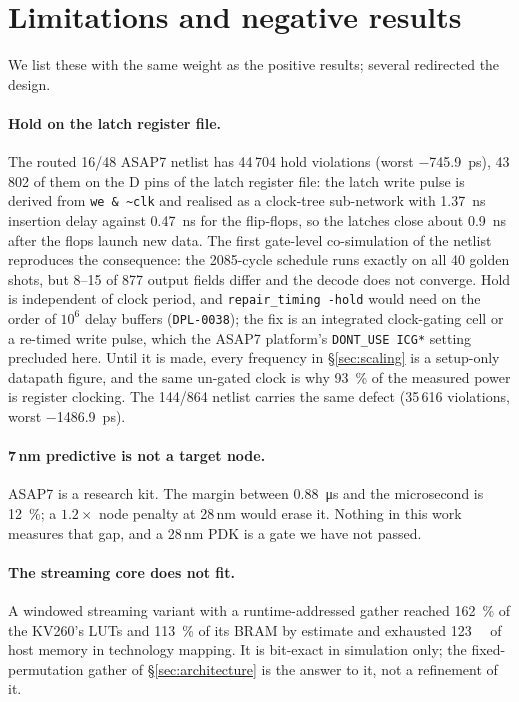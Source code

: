 \section{Limitations and negative results}
\label{sec:limitations}

We list these with the same weight as the positive results; several redirected the design.

\paragraph{Hold on the latch register file.}
The routed 16/48 ASAP7 netlist has 44\,704 hold violations (worst \SI{-745.9}{\pico\second}), 43\,802
of them on the D pins of the latch register file: the latch write pulse is derived from
\texttt{we \& \textasciitilde{}clk} and realised as a clock-tree sub-network with \SI{1.37}{\nano\second}
insertion delay against \SI{0.47}{\nano\second} for the flip-flops, so the latches close about
\SI{0.9}{\nano\second} after the flops launch new data. The first gate-level co-simulation of the
netlist reproduces the consequence: the 2085-cycle schedule runs exactly on all 40 golden shots, but
8--15 of 877 output fields differ and the decode does not converge. Hold is independent of clock
period, and \texttt{repair\_timing -hold} would need on the order of $10^6$ delay buffers
(\texttt{DPL-0038}); the fix is an integrated clock-gating cell or a re-timed write pulse, which the
ASAP7 platform's \texttt{DONT\_USE ICG*} setting precluded here. Until it is made, every frequency
in \S\ref{sec:scaling} is a setup-only datapath figure, and the same un-gated clock is why
\SI{93}{\percent} of the measured power is register clocking. The 144/864 netlist carries the same
defect (35\,616 violations, worst \SI{-1486.9}{\pico\second}).

\paragraph{7\,nm predictive is not a target node.}
ASAP7 \citep{clark2016asap7} is a research kit. The margin between \SI{0.88}{\micro\second} and the
microsecond is \SI{12}{\percent}; a $1.2\times$ node penalty at 28\,nm would erase it. Nothing in this
work measures that gap, and a 28\,nm PDK is a gate we have not passed.

\paragraph{The streaming core does not fit.}
A windowed streaming variant with a runtime-addressed gather reached \SI{162}{\percent} of the KV260's
LUTs and \SI{113}{\percent} of its BRAM by estimate and exhausted \SI{123}{\giga\byte} of host memory
in technology mapping. It is bit-exact in simulation only; the fixed-permutation gather of
\S\ref{sec:architecture} is the answer to it, not a refinement of it.

